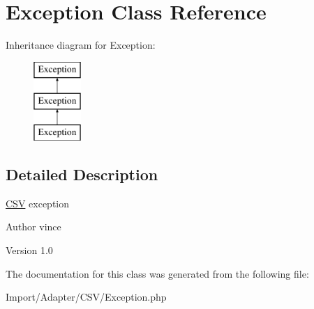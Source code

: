 \hypertarget{class_anemo_1_1_import_1_1_adapter_1_1_c_s_v_1_1_exception}{
\section{Exception Class Reference}
\label{class_anemo_1_1_import_1_1_adapter_1_1_c_s_v_1_1_exception}
}
Inheritance diagram for Exception:\begin{figure}[H]
\begin{center}
\leavevmode
\includegraphics[height=3.000000cm]{class_anemo_1_1_import_1_1_adapter_1_1_c_s_v_1_1_exception}
\end{center}
\end{figure}


\subsection{Detailed Description}
\hyperlink{class_anemo_1_1_import_1_1_adapter_1_1_c_s_v}{CSV} exception \begin{DoxyAuthor}{Author}
vince 
\end{DoxyAuthor}
\begin{DoxyVersion}{Version}
1.0 
\end{DoxyVersion}


The documentation for this class was generated from the following file:\begin{DoxyCompactItemize}
\item 
Import/Adapter/CSV/Exception.php\end{DoxyCompactItemize}
